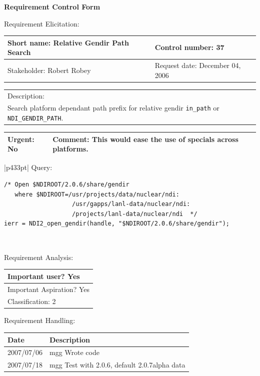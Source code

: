 \begin{center}\Large\bf
Requirement Control Form
\end{center}
\vspace{24pt}

Requirement Elicitation:

\begin{tabular}{|p{211pt}|p{211pt}|} \hline
Short name: Relative Gendir Path Search & Control number: 37\\ \hline
Stakeholder: Robert Robey & Request date: December 04, 2006\\
\end{tabular}
\begin{tabular}{|p{433pt}|} \hline
Description: \\ 
Search platform dependant path prefix for relative gendir
\texttt{in\_path} or \texttt{NDI\_GENDIR\_PATH}.\\
\hline
\end{tabular} 
\begin{tabular}{|p{211pt}|p{211pt}|} \hline
Urgent: No & Comment: This would ease the use of specials across
platforms.\\ \hline
\end{tabular}

\vspace{12pt}

\begin{tabular}{|p{433pt}|} \hline
Query: 
\begin{verbatim}
/* Open $NDIROOT/2.0.6/share/gendir
   where $NDIROOT=/usr/projects/data/nuclear/ndi:
                   /usr/gapps/lanl-data/nuclear/ndi: 
                   /projects/lanl-data/nuclear/ndi  */
ierr = NDI2_open_gendir(handle, "$NDIROOT/2.0.6/share/gendir");
\end{verbatim}
\\ \hline
\end{tabular}
\vspace{24pt}

Requirement Analysis:

\begin{tabular}{|p{433pt}|} \hline
Important user? Yes \\ \hline
Important Aspiration? Yes \\ \hline
Classification: 2 \\ \hline
\end{tabular}
\vspace{24pt}

Requirement Handling:

\begin{tabular}{|p{72pt}|p{351pt}|} \hline
Date & Description \\ \hline
2007/07/06 & mgg Wrote code \\ \hline 
2007/07/18 & mgg Test with 2.0.6, default 2.0.7alpha data \\ \hline 
\end{tabular}
